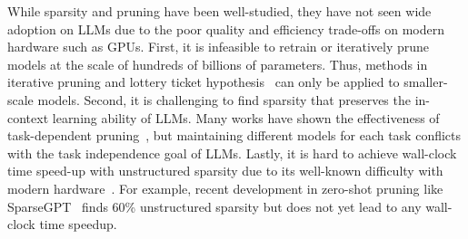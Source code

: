 While sparsity and pruning have been well-studied, they have not seen wide adoption on LLMs due to the poor quality and efficiency trade-offs on modern hardware such as GPUs. First, it is infeasible to retrain or iteratively prune models at the scale of hundreds of billions of parameters. Thus, methods in iterative pruning and lottery ticket hypothesis~\cite{lee2018snip,frankle2018lottery} can only be applied to smaller-scale models. Second, it is challenging to find sparsity that preserves the in-context learning ability of LLMs. Many works have shown the effectiveness of task-dependent pruning~\cite{michel2019sixteen,bansal2022rethinking}, but maintaining different models for each task conflicts with the task independence goal of LLMs. Lastly, it is hard to achieve wall-clock time speed-up with unstructured sparsity due to its well-known difficulty with modern hardware~\cite{hooker2021hardware}. For example, recent development in zero-shot pruning like SparseGPT~\cite{frantar2023massive} finds 60\% unstructured sparsity but does not yet lead to any wall-clock time speedup.



